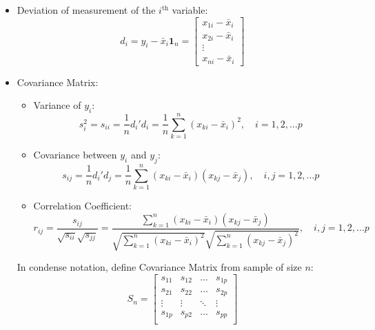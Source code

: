 \begin{itemize}[topsep=6pt,itemsep=4pt]
        \item Deviation of measurement of the $ i^\mathrm{th} $ variable:
        \begin{equation}
            d_i=y_i-\bar{x}_i\mathbf{1}_n=\begin{bmatrix}
                x_{1i}-\bar{x}_i\\x_{2i}-\bar{x}_i\\\vdots\\x_{ni}-\bar{x}_i
            \end{bmatrix} 
        \end{equation}
        \item Covariance Matrix:
            \begin{itemize}[topsep=6pt,itemsep=4pt]      
            \item Variance of $ y_i $:
            \begin{equation}
                s^2_i=s_{ii}=\dfrac{1}{n}d_i'd_i =\dfrac{1}{n}\sum_{k=1}^n (x_{ki}-\bar{x}_i)^2,\quad i=1,2,\ldots p
            \end{equation}
            \item Covariance between $ y_i $ and $ y_j $:
            \begin{equation}
                s_{ij}=\dfrac{1}{n}d_i'd_j=\dfrac{1}{n}\sum_{k=1}^n(x_{ki}-\bar{x}_i)(x_{kj}-\bar{x}_j),\quad i,j=1,2,\ldots p
            \end{equation}
            \item Correlation Coefficient:
            \begin{equation}\label{EqaEstimatorOfCorrelationCoefficient}
                r_{ij}=\dfrac{s_{ij}}{\sqrt{s_{ii}}\sqrt{s_{jj}}}=\dfrac{{\displaystyle\sum_{k=1}^n(x_{ki}-\bar{x}_i)(x_{kj}-\bar{x}_j)}}{\sqrt{{\displaystyle\sum_{k=1}^n(x_{ki}-\bar{x}_i)^2}}\sqrt{{\displaystyle\sum_{k=1}^n(x_{kj}-\bar{x}_j)^2}}},\quad i,j=1,2,\ldots p
            \end{equation}
            \end{itemize}
        
        In condense notation, define Covariance Matrix from sample of size $ n $:
        \begin{equation}\label{EqaSampleCovarianceMatrix}
            S_n=\begin{bmatrix}
            s_{11}&s_{12}&\ldots&s_{1p}\\
            s_{21}&s_{22}&\ldots&s_{2p}\\
            \vdots&\vdots&\ddots&\vdots\\
            s_{1p}&s_{p2}&\ldots&s_{pp}\\
            \end{bmatrix}
        \end{equation}


\end{itemize}
